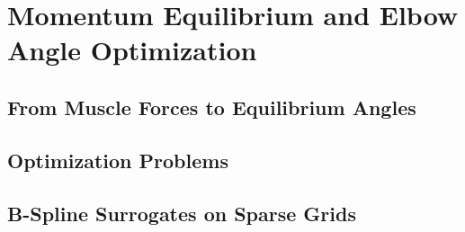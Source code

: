 \section{Momentum Equilibrium and Elbow Angle Optimization}
\label{sec:72methodology}

\dummytext[3]{}



\subsection{From Muscle Forces to Equilibrium Angles}
\label{sec:721equilibrium}

\dummytext[3]{}



\subsection{Optimization Problems}
\label{sec:722optimization}

\dummytext[3]{}



\subsection{B-Spline Surrogates on Sparse Grids}
\label{sec:723surrogates}


\dummytext[3]{}
